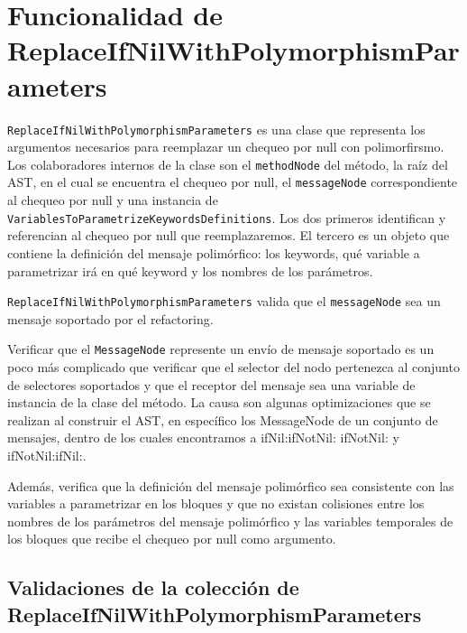 
\section{Funcionalidad de ReplaceIfNilWithPolymorphismParameters}

\lstinline{ReplaceIfNilWithPolymorphismParameters} es una clase que representa los argumentos necesarios
para reemplazar un chequeo por null con polimorfirsmo. Los colaboradores internos de la clase son el
\lstinline{methodNode} del método, la raíz del AST, en el cual se encuentra el chequeo por null,
el \lstinline{messageNode} correspondiente al chequeo por null y una instancia de
\lstinline{VariablesToParametrizeKeywordsDefinitions}. Los dos primeros identifican y referencian al
chequeo por null que reemplazaremos. El tercero es un objeto que contiene la definición del 
mensaje polimórfico: los keywords, qué variable a parametrizar irá en qué keyword y los nombres de
los parámetros.

\lstinline{ReplaceIfNilWithPolymorphismParameters} valida que el \lstinline{messageNode} sea un mensaje
soportado por el refactoring.

Verificar que el \lstinline{MessageNode} represente un envío de mensaje soportado es un poco más 
complicado que verificar que el selector del nodo pertenezca al conjunto de selectores soportados
y que el receptor del mensaje sea una variable de instancia de la clase del método. La causa son algunas
optimizaciones que se realizan al construir el AST, en específico los MessageNode de un conjunto de mensajes,
dentro de los cuales encontramos a ifNil:ifNotNil: ifNotNil: y ifNotNil:ifNil:.


Además, verifica que la definición del mensaje polimórfico sea consistente con las variables a parametrizar
en los bloques y que no existan colisiones entre los nombres de los parámetros del mensaje polimórfico
y las variables temporales de los bloques que recibe el chequeo por null como argumento.


\subsection{Validaciones de la colección de ReplaceIfNilWithPolymorphismParameters}

